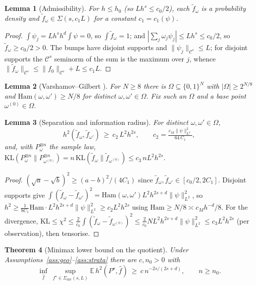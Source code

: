 \documentclass[11pt]{article}
\theoremstyle{plain}
\newtheorem{theorem}{Theorem}[section]
\newtheorem{lemma}[theorem]{Lemma}
\theoremstyle{definition}
\theoremstyle{remark}
\newcommand{\E}{\mathbb{E}}
\newcommand{\KL}{\mathrm{KL}}
\newcommand{\Ham}{\mathrm{Ham}}
\newcommand{\Siv}{\Sigma_{\mathrm{inv}}}
\begin{document}
\begin{lemma}[Admissibility]\label{lem:admiss}
For $h\le h_0$ (so $Lh^s\le c_0/2$), each $\tilde f_\omega$ is a probability
density and $\tilde f_\omega\in\Sigma(s,c_1L)$ for a constant $c_1=c_1(\psi)$.
\end{lemma}

\begin{proof}
$\int\psi_j=Lh^s h^d\int\psi=0$, so $\int\tilde f_\omega=1$; and
$|\sum_j\omega_j\psi_j|\le Lh^s\le c_0/2$, so $\tilde f_\omega\ge c_0/2>0$. The
bumps have disjoint supports and $\|\psi_j\|_{\mathcal C^s}\le L$; for disjoint
supports the $\mathcal C^s$ seminorm of the sum is the maximum over $j$, whence
$\|\tilde f_\omega\|_{\mathcal C^s}\le\|f_0\|_{\mathcal C^s}+L\le c_1L$.
\end{proof}

\begin{lemma}[Varshamov--Gilbert {\cite[Lem.~2.9]{tsybakov}}]\label{lem:vg}
For $N\ge8$ there is $\Omega\subseteq\{0,1\}^N$ with $|\Omega|\ge2^{N/8}$ and
$\Ham(\omega,\omega')\ge N/8$ for distinct $\omega,\omega'\in\Omega$. Fix such an
$\Omega$ and a base point $\omega^{(0)}\in\Omega$.
\end{lemma}

\begin{lemma}[Separation and information radius]\label{lem:sepkl}
For distinct $\omega,\omega'\in\Omega$,
\[
h^2(\tilde f_\omega,\tilde f_{\omega'})\ \ge\ c_2\,L^2h^{2s},\qquad
c_2=\tfrac{c_M\|\psi\|_{L^2}^2}{64\,C_1},
\]
and, with $P_\omega^{\otimes n}$ the sample law,
$\KL(P_\omega^{\otimes n}\|P_{\omega^{(0)}}^{\otimes n})=n\,\KL(\tilde f_\omega\|\tilde f_{\omega^{(0)}})\le c_3\,nL^2h^{2s}$.
\end{lemma}

\begin{proof}
$(\sqrt a-\sqrt b)^2\ge(a-b)^2/(4C_1)$ since
$\tilde f_\omega,\tilde f_{\omega'}\in[c_0/2,2C_1]$. Disjoint supports give
$\int(\tilde f_\omega-\tilde f_{\omega'})^2=\Ham(\omega,\omega')L^2h^{2s+d}\|\psi\|_{L^2}^2$,
so $h^2\ge\tfrac1{8C_1}\Ham\cdot L^2h^{2s+d}\|\psi\|_{L^2}^2\ge c_2L^2h^{2s}$ using
$\Ham\ge N/8\asymp c_Mh^{-d}/8$. For the divergence,
$\KL\le\chi^2\le\tfrac2{c_0}\int(\tilde f_\omega-\tilde f_{\omega^{(0)}})^2\le\tfrac2{c_0}NL^2h^{2s+d}\|\psi\|_{L^2}^2\le c_3L^2h^{2s}$
(per observation), then tensorise.
\end{proof}

\begin{theorem}[Minimax lower bound on the quotient]\label{thm:lower}
Under Assumptions~\ref{ass:geo}--\ref{ass:strata} there are $c,n_0>0$ with
\[
\inf_{\widehat f}\ \sup_{f^\star\in\Siv(s,L)}\E\,h^2(P^\star,\widehat f)
\ \ge\ c\,n^{-2s/(2s+d)},\qquad n\ge n_0 .
\]
\end{theorem}
\end{document}
